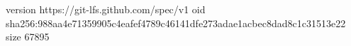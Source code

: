 version https://git-lfs.github.com/spec/v1
oid sha256:988aa4e71359905c4eafef4789c46141dfe273adae1acbec8dad8c1c31513e22
size 67895
